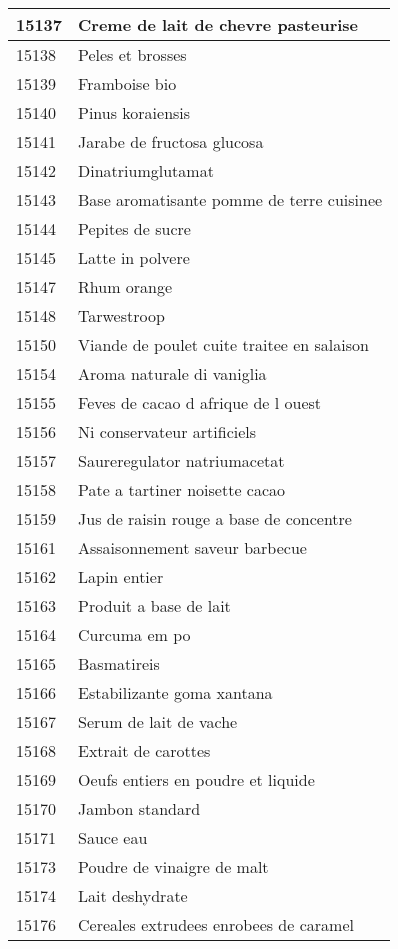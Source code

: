 \begin{longtable}{|l|l|}
15137 & Creme de lait de chevre pasteurise \\ \hline 
15138 & Peles et brosses \\ \hline 
15139 & Framboise bio \\ \hline 
15140 & Pinus koraiensis \\ \hline 
15141 & Jarabe de fructosa glucosa \\ \hline 
15142 & Dinatriumglutamat \\ \hline 
15143 & Base aromatisante pomme de terre cuisinee \\ \hline 
15144 & Pepites de sucre \\ \hline 
15145 & Latte in polvere \\ \hline 
15147 & Rhum orange \\ \hline 
15148 & Tarwestroop \\ \hline 
15150 & Viande de poulet cuite traitee en salaison \\ \hline 
15154 & Aroma naturale di vaniglia \\ \hline 
15155 & Feves de cacao d afrique de l ouest \\ \hline 
15156 & Ni conservateur artificiels \\ \hline 
15157 & Saureregulator natriumacetat \\ \hline 
15158 & Pate a tartiner noisette cacao \\ \hline 
15159 & Jus de raisin rouge a base de concentre \\ \hline 
15161 & Assaisonnement saveur barbecue \\ \hline 
15162 & Lapin entier \\ \hline 
15163 & Produit a base de lait \\ \hline 
15164 & Curcuma em po \\ \hline 
15165 & Basmatireis \\ \hline 
15166 & Estabilizante goma xantana \\ \hline 
15167 & Serum de lait de vache \\ \hline 
15168 & Extrait de carottes \\ \hline 
15169 & Oeufs entiers en poudre et liquide \\ \hline 
15170 & Jambon standard \\ \hline 
15171 & Sauce eau \\ \hline 
15173 & Poudre de vinaigre de malt \\ \hline 
15174 & Lait deshydrate \\ \hline 
15176 & Cereales extrudees enrobees de caramel \\ \hline 

\end{longtable}
